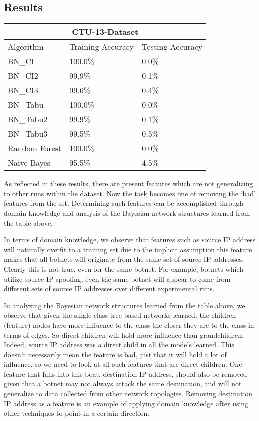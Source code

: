 \documentclass[letterpaper]{article}
\begin{document}
\subsection{Results}

\begin{tabular}{ |p{2.3cm}|p{1.9cm}|p{1.9cm}|  }
\hline
\multicolumn{3}{|c|}{CTU-13-Dataset} \\
\hline
Algorithm & Training Accuracy & Testing Accuracy \\
\hline
BN\_CI & 100.0\% & 0.0\% \\
BN\_CI2 & 99.9\% & 0.1\% \\
BN\_CI3 & 99.6\% & 0.4\% \\
BN\_Tabu & 100.0\% & 0.0\% \\
BN\_Tabu2 & 99.9\% & 0.1\% \\
BN\_Tabu3 & 99.5\% & 0.5\% \\
Random Forest & 100.0\% & 0.0\% \\
Naive Bayes & 95.5\% & 4.5\% \\
\hline
\end{tabular}

As reflected in these results, there are present features which are not generalizing to other runs within the dataset.  Now the task becomes one of removing the `bad' features from the set.  Determining such features can be accomplished through domain knowledge and analysis of the Bayesian network structures learned from the table above.

In terms of domain knowledge, we observe that features such as source IP address will naturally overfit to a training set due to the implicit assumption this feature makes that all botnets will originate from the same set of source IP addresses.  Clearly this is not true, even for the same botnet.  For example, botnets which utilize source IP spoofing, even the same botnet will appear to come from different sets of source IP addresses over different experimental runs.

In analyzing the Bayesian network structures learned from the table above, we observe that given the single class tree-based networks learned, the children (feature) nodes have more influence to the class the closer they are to the class in terms of edges.  So direct children will hold more influence than grandchildren.  Indeed, source IP address was a direct child in all the models learned.  This doesn't necessarily mean the feature is bad, just that it will hold a lot of influence, so we need to look at all such features that are direct children.  One feature that falls into this boat, destination IP address, should also be removed given that a botnet may not always attack the same destination, and will not generalize to data collected from other network topologies. Removing destination IP address as a feature is an example of applying domain knowledge after using other techniques to point in a certain direction.
\end{document}
